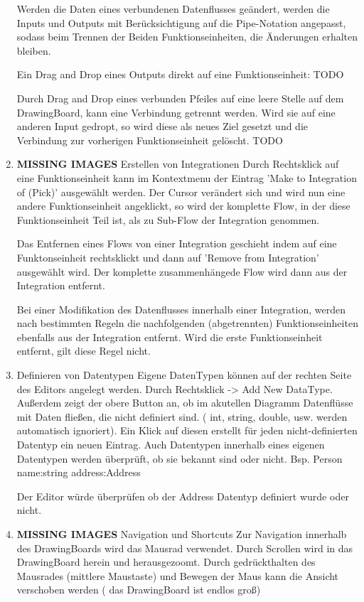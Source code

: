 \documentclass[11pt]{article}
\begin{document}
\begin{enumerate}
Werden die Daten eines verbundenen Datenflusses geändert, werden die Inputs
und Outputs mit Berücksichtigung auf die Pipe-Notation angepasst, sodass
beim Trennen der Beiden Funktionseinheiten, die Änderungen erhalten bleiben.

Ein Drag and Drop eines Outputs direkt auf eine Funktionseinheit: TODO

Durch Drag and Drop eines verbunden Pfeiles auf eine leere Stelle auf dem
DrawingBoard, kann eine Verbindung getrennt werden. Wird sie auf eine
anderen Input gedropt, so wird diese als neues Ziel gesetzt und die 
Verbindung zur vorherigen Funktionseinheit gelöscht. TODO


\item {\bfseries\sffamily MISSING IMAGES} Erstellen von Integrationen
\label{sec:orgheadline18}
Durch Rechtsklick auf eine Funktionseinheit kann im Kontextmenu der Eintrag
'Make to Integration of (Pick)' ausgewählt werden. Der Cursor verändert
sich und wird nun eine andere Funktionseinheit angeklickt, so wird der
komplette Flow, in der diese Funktionseinheit Teil ist, als zu
Sub-Flow der Integration genommen.

Das Entfernen eines Flows von einer Integration geschieht indem auf eine
Funktonseinheit rechtsklickt und dann auf 'Remove from Integration'
ausgewählt wird. Der komplette zusammenhängede Flow wird dann aus der
Integration entfernt. 


Bei einer Modifikation des Datenflusses innerhalb einer Integration, werden nach
bestimmten Regeln die nachfolgenden (abgetrennten) Funktionseinheiten
ebenfalls aus der Integration entfernt. Wird die erste Funktionseinheit
entfernt, gilt diese Regel nicht.

\item Definieren von Datentypen
\label{sec:orgheadline19}
Eigene DatenTypen können auf der rechten Seite des Editors angelegt werden.
Durch Rechtsklick -> Add New DataType. Außerdem zeigt der obere Button an,
ob im akutellen Diagramm Datenflüsse mit Daten fließen, die nicht definiert
sind. ( int, string, double, usw. werden automatisch ignoriert). Ein Klick
auf diesen erstellt für jeden nicht-definierten Datentyp ein neuen Eintrag.
Auch Datentypen innerhalb eines eigenen Datentypen werden überprüft, ob sie 
bekannt sind oder nicht. Bsp. 
Person 
name:string
address:Address  

Der Editor würde überprüfen ob der Address Datentyp definiert wurde oder nicht.

\item {\bfseries\sffamily MISSING IMAGES} Navigation und Shortcuts
\label{sec:orgheadline20}
Zur Navigation innerhalb des DrawingBoards wird das Mausrad verwendet.
Durch Scrollen wird in das DrawingBoard herein und herausgezoomt.
Durch gedrückthalten des Mausrades (mittlere Maustaste) und Bewegen der
Maus kann die Ansicht verschoben werden ( das DrawingBoard ist endlos groß)


\end{enumerate}
\end{document}

